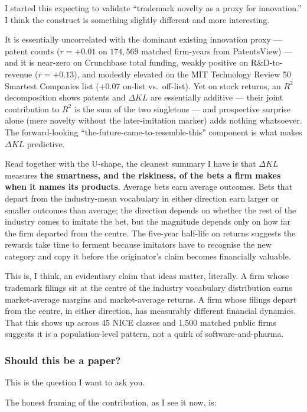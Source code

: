 \documentclass[11pt]{article}
\begin{document}
I started this expecting to validate ``trademark novelty as a
proxy for innovation.'' I think the construct is something
slightly different and more interesting.

It is essentially uncorrelated with the dominant existing
innovation proxy --- patent counts ($r=+0.01$ on
$174{,}569$ matched firm-years from PatentsView) --- and it is
near-zero on Crunchbase total funding, weakly positive on
R\&D-to-revenue ($r=+0.13$), and modestly elevated on the MIT
Technology Review 50 Smartest Companies list ($+0.07$ on-list vs.\
off-list). Yet on stock returns, an $R^2$ decomposition shows
patents and $\Delta KL$ are essentially additive --- their joint
contribution to $R^2$ is the sum of the two singletons --- and
prospective surprise alone (mere novelty without the
later-imitation marker) adds nothing whatsoever. The forward-looking
``the-future-came-to-resemble-this'' component is what makes
$\Delta KL$ predictive.

Read together with the U-shape, the cleanest summary I have is
that $\Delta KL$ measures \textbf{the smartness, and the
riskiness, of the bets a firm makes when it names its products}.
Average bets earn average outcomes. Bets that depart from the
industry-mean vocabulary in either direction earn larger or
smaller outcomes than average; the direction depends on whether
the rest of the industry comes to imitate the bet, but the
magnitude depends only on how far the firm departed from the
centre. The five-year half-life on returns suggests the rewards
take time to ferment because imitators have to recognise the new
category and copy it before the originator's claim becomes
financially valuable.

This is, I think, an evidentiary claim that ideas matter,
literally. A firm whose trademark filings sit at the centre of
the industry vocabulary distribution earns market-average margins
and market-average returns. A firm whose filings depart from the
centre, in either direction, has measurably different financial
dynamics. That this shows up across 45 NICE classes and 1{,}500
matched public firms suggests it is a population-level pattern,
not a quirk of software-and-pharma.

\subsubsection*{Should this be a paper?}

This is the question I want to ask you.

The honest framing of the contribution, as I see it now, is:
\end{document}
